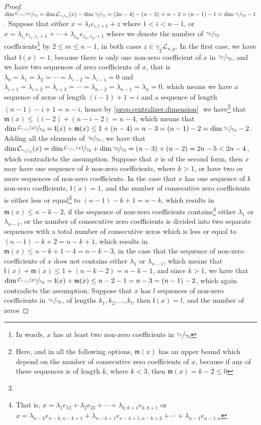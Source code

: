 \documentclass[12pt]{article}
\begin{document}
\begin{proof}
$\dim\sfrac{\mathcal{C}_{\sfrac{\gamma_1}{\gamma_3}}(x)}{\gamma_2}=\dim\mathcal{C}_{\sfrac{\gamma_1}{\gamma_3}}(x)-\dim\sfrac{\gamma_2}{\gamma_3}=(2n-4)-(n-2)=n-2=(n-1)-1=\dim\sfrac{\gamma_1}{\gamma_2}-1$. Suppose that either $x=\lambda_i e_{i,i+1}+z$ where $1<i<n-1$, or $x=\lambda_{i_1}e_{i_1,i_1+1}+\cdots+\lambda_{i_m}e_{i_m,i_m+1}$ where we denote the number of $\sfrac{\gamma_1}{\gamma_2}$ coefficients\footnote{In words, $x$ has at least two non-zero coefficients in $\sfrac{\gamma_1}{\gamma_2}$} by $2\leq m\leq n-1$, in both cases $z\in\gamma_2\mathcal{L}_{n,p}$. In the first case, we have that $\mathfrak{l}(x)=1$, because there is only one non-zero coefficient of $x$ in $\sfrac{\gamma_1}{\gamma_2}$, and we have two sequences of zero coefficients of $x$, that is $\lambda_0=\lambda_1=\lambda_2=\cdots=\lambda_{i-2}=\lambda_{i-1}=0$ and $\lambda_{i+1}=\lambda_{i+2}=\lambda_{i+3}=\cdots=\lambda_{n-2}=\lambda_{n-1}=\lambda_n=0$, which means we have a sequence of zeros of length $(i-1)+1=i$ and a sequence of length $(n-1)-i+1=n-i$, hence by \ref{prop.centralizer.dimension} $\mathfrak{}$ we have\footnote{Here, and in all the following options, $\mathfrak{m}(x)$ has an upper bound which depend on the number of consecutive zero coefficients of $x$, because if any of these sequences is of length $k$, where $k<3$, then $\mathfrak{m}(x)=k-2\leq 0$} that $\mathfrak{m}(x)\leq(i-2)+(n-i-2)=n-4$, which means that $\dim\sfrac{\mathcal{C}_{\sfrac{\gamma_1}{\gamma_3}}(x)}{\gamma_2}=\mathfrak{l}(x)+\mathfrak{m}(x)\leq 1+(n-4)=n-3=(n-1)-2=\dim\sfrac{\gamma_1}{\gamma_2}-2$. Adding all the elements of $\sfrac{\gamma_2}{\gamma_3}$, we have that $\dim\mathcal{C}_{\sfrac{\gamma_1}{\gamma_3}}(x)=\dim\sfrac{\mathcal{C}_{\sfrac{\gamma_1}{\gamma_3}}(x)}{\gamma_2}+\dim\sfrac{\gamma_2}{\gamma_3}=(n-3)+(n-2)=2n-5<2n-4$, which contradicts the assumption. Suppose that $x$ is of the second form, then $x$ may have one sequence of $k$ non-zero coefficients, where $k>1$, or have two or more sequences of non-zero coefficients. In the case that $x$ has one sequence of $k$ non-zero coefficients, $\mathfrak{l}(x)=1$, and the number of consecutive zero coefficients is either less or equal\footnote{} to $(n-1)-k+1=n-k$, which results in $\mathfrak{m}(x)\leq n-k-2$, if the sequence of non-zero coefficients contains\footnote{That is, $x=\lambda_1 e_{12}+\lambda_2 e_{23}+\cdots+\lambda_{k,k+1}e_{k,k+1}$ or $x=\lambda_{n-k}e_{n-k,n-k+1}+\lambda_{n-k+1}e_{n-k+1,n-k+2}+\cdots+\lambda_{n-1}e_{n-1,n}$} either $\lambda_1$ or $\lambda_{n-1}$, or the number of consecutive zero coefficients is divided into two separate sequences with a total number of consecutive zeros which is less or equal to $(n-1)-k+2=n-k+1$, which results in $\mathfrak{m}(x)\leq n-k+1-4=n-k-3$, in the case that the sequence of non-zero coefficients of $x$ does not contains either $\lambda_1$ or $\lambda_{n-1}$, which means that $\mathfrak{l}(x)+\mathfrak{m}(x)\leq 1+(n-k-2)=n-k-1$, and since $k>1$, we have that $\dim\sfrac{\mathcal{C}_{\sfrac{\gamma_1}{\gamma_3}}(x)}{\gamma_2}=\mathfrak{l}(x)+\mathfrak{m}(x)\leq n-2-1=n-3=(n-1)-2$, which again contradicts the assumption. Suppose that $x$ has $l$ sequences of non-zero coefficients in $\sfrac{\gamma_1}{\gamma_2}$, of lengths $k_1,k_2,\dots,k_l$, then $\mathfrak{l}(x)=l$, and the number of zeros 
\end{proof}
\end{document}
